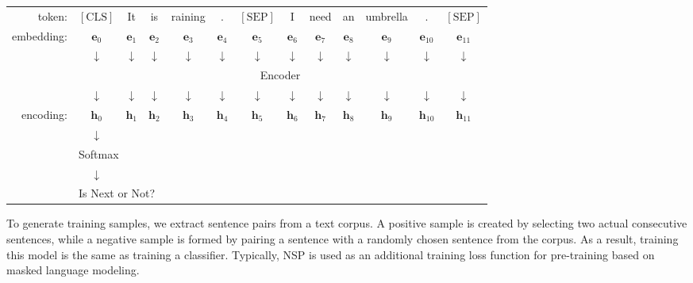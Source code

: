 \vspace{0.5em}
\begin{center}
\begingroup
\renewcommand{\arraystretch}{1.2}
\setlength{\tabcolsep}{3pt}
\begin{tabular}{r c c c c c c c c c c c c}
token: & {\color{red} $[\mathrm{CLS}]$} & It & is & raining & . & $[\mathrm{SEP}]$ & I & need & an & umbrella & . & $[\mathrm{SEP}]$ \\
embedding: & {\color{red} $\mathbf{e}_0$} & $\mathbf{e}_1$ & $\mathbf{e}_2$ & $\mathbf{e}_3$ & $\mathbf{e}_4$ & $\mathbf{e}_5$ & $\mathbf{e}_6$ & $\mathbf{e}_7$ & $\mathbf{e}_8$ & $\mathbf{e}_9$ & $\mathbf{e}_{10}$ & $\mathbf{e}_{11}$ \\
 & {\color{red} $\downarrow$} & $\downarrow$ & $\downarrow$ & $\downarrow$ & $\downarrow$ & $\downarrow$ & $\downarrow$ & $\downarrow$ & $\downarrow$ & $\downarrow$ & $\downarrow$ & $\downarrow$ \\ \cline{2-13}
& \multicolumn{12}{|c|}{Encoder} \\ \cline{2-13}
 & {\color{red} $\downarrow$} & $\downarrow$ & $\downarrow$ & $\downarrow$ & $\downarrow$ & $\downarrow$ & $\downarrow$ & $\downarrow$ & $\downarrow$ & $\downarrow$ & $\downarrow$ & $\downarrow$ \\
 encoding: & {\color{red} $\mathbf{h}_0$} & $\mathbf{h}_1$ & $\mathbf{h}_2$ & $\mathbf{h}_3$ & $\mathbf{h}_4$ & $\mathbf{h}_5$ & $\mathbf{h}_6$ & $\mathbf{h}_7$ & $\mathbf{h}_8$ & $\mathbf{h}_9$ & $\mathbf{h}_{10}$ & $\mathbf{h}_{11}$ \\
 & $\downarrow$ \\
 & \multicolumn{3}{l}{Softmax} \\
 & $\downarrow$ \\
 & \multicolumn{3}{l}{Is Next or Not?}
\end{tabular}
\endgroup
\end{center}
\vspace{0.5em}

To generate training samples, we extract sentence pairs from a text corpus. A positive sample is created by selecting two actual consecutive sentences, while a negative sample is formed by pairing a sentence with a randomly chosen sentence from the corpus. As a result, training this model is the same as training a classifier. Typically, NSP is used as an additional training loss function for pre-training based on masked language modeling.


